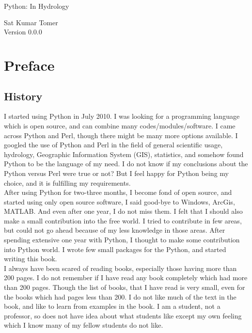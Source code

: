 \documentclass[10pt]{book}
\newcommand{\thetitle}{Python: In Hydrology}
\newcommand{\theversion}{0.0.0}
\begin{document}

\begin{htmlonly}


{\Large \thetitle}

{\large Sat Kumar Tomer} \\


Version \theversion

\setcounter{chapter}{-1}

\end{htmlonly}

\chapter{Preface}

\section*{History}

I started using Python in July 2010. I was looking for a programming language which is open source, and can combine many codes/modules/software. I came across Python and Perl, though there might be many more options available. I googled the use of Python and Perl in the field of general scientific usage, hydrology, Geographic Information System (GIS), statistics, and somehow found Python to be the language of my need. I do not know if my conclusions about the Python versus Perl were true or not? But I feel happy for Python being my choice, and it is fulfilling my requirements. \\

After using Python for two-three months, I become fond of open source, and started using only open source software, I said good-bye to Windows, ArcGis, MATLAB. And even after one year, I do not miss them. I felt that I should also make a small contribution into the free world. I tried to contribute in few areas, but could not go ahead because of my less knowledge in those areas. After spending extensive one year with Python, I thought to make some contribution into Python world. I wrote few small packages for the Python, and started writing this book. \\

I always have been scared of reading books, especially those having more than 200 pages. I do not remember if I have read any book completely which had more than 200 pages. Though the list of books, that I have read is very small, even for the books which had pages less than 200. I do not like much of the text in the book, and like to learn from examples in the book. I am a student, not a professor, so does not have idea about what students like except my own feeling which I know many of my fellow students do not like. \\
\end{document}

